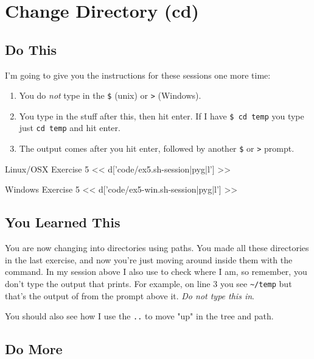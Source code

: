 \chapter{Change Directory (cd)}

\section{Do This}

I'm going to give you the instructions for these sessions one more time:

\begin{enumerate} 
\item You do \emph{not} type in the \verb|$| (unix) or \verb|>| (Windows).
\item You type in the stuff after this, then hit enter.  If I have \verb|$ cd temp| you type just \verb|cd temp| and hit enter.
\item The output comes after you hit enter, followed by another \verb|$| or \verb|>| prompt.
\end{enumerate}

\begin{code}{Linux/OSX Exercise 5}
<< d['code/ex5.sh-session|pyg|l'] >>
\end{code}

\begin{code}{Windows Exercise 5}
<< d['code/ex5-win.sh-session|pyg|l'] >>
\end{code}

\section{You Learned This}

You are now changing into directories using paths.  You made all these directories
in the last exercise, and now you're just moving around inside them with the
 command.  In my session above I also use  to check
where I am, so remember, you don't type the output that  prints.
For example, on line 3 you see \verb|~/temp| but that's the output of 
from the prompt above it.  \emph{Do not type this in}.

You should also see how I use the \verb|..| to move "up" in the tree and path.



\section{Do More}

